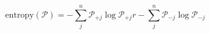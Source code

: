 \begin{equation}
\text{entropy}(\mathcal P) = -\sum_j^n\mathcal P_{+j}\log\mathcal P_{+j}r -\sum_j^n\mathcal P_{-j}\log\mathcal P_{-j} 
\end{equation}